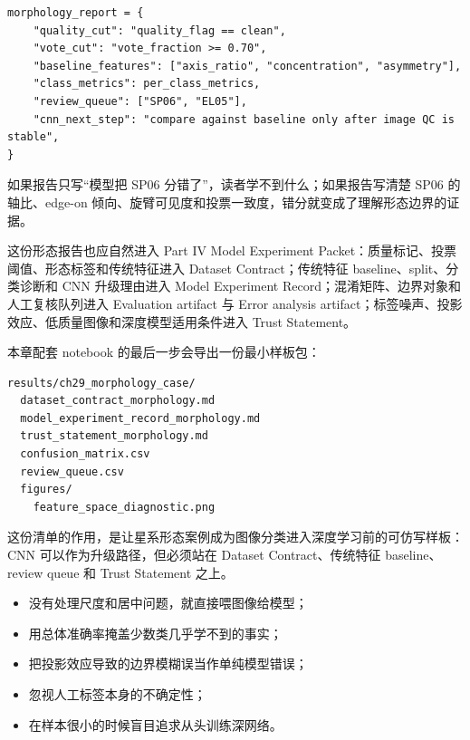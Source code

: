 \begin{examplebox}[星系形态案例报告骨架]
\begin{lstlisting}[style=pythonstyle]
morphology_report = {
    "quality_cut": "quality_flag == clean",
    "vote_cut": "vote_fraction >= 0.70",
    "baseline_features": ["axis_ratio", "concentration", "asymmetry"],
    "class_metrics": per_class_metrics,
    "review_queue": ["SP06", "EL05"],
    "cnn_next_step": "compare against baseline only after image QC is stable",
}
\end{lstlisting}
\end{examplebox}

如果报告只写“模型把 SP06 分错了”，读者学不到什么；如果报告写清楚 SP06 的轴比、edge-on 倾向、旋臂可见度和投票一致度，错分就变成了理解形态边界的证据。

这份形态报告也应自然进入 Part IV Model Experiment Packet：质量标记、投票阈值、形态标签和传统特征进入 Dataset Contract；传统特征 baseline、split、分类诊断和 CNN 升级理由进入 Model Experiment Record；混淆矩阵、边界对象和人工复核队列进入 Evaluation artifact 与 Error analysis artifact；标签噪声、投影效应、低质量图像和深度模型适用条件进入 Trust Statement。

本章配套 notebook 的最后一步会导出一份最小样板包：

\begin{examplebox}
\begin{lstlisting}[style=terminal]
results/ch29_morphology_case/
  dataset_contract_morphology.md
  model_experiment_record_morphology.md
  trust_statement_morphology.md
  confusion_matrix.csv
  review_queue.csv
  figures/
    feature_space_diagnostic.png
\end{lstlisting}
\end{examplebox}

这份清单的作用，是让星系形态案例成为图像分类进入深度学习前的可仿写样板：CNN 可以作为升级路径，但必须站在 Dataset Contract、传统特征 baseline、review queue 和 Trust Statement 之上。

\begin{warnbox}[星系形态分类中的常见误区]
\begin{itemize}
    \item 没有处理尺度和居中问题，就直接喂图像给模型；
    \item 用总体准确率掩盖少数类几乎学不到的事实；
    \item 把投影效应导致的边界模糊误当作单纯模型错误；
    \item 忽视人工标签本身的不确定性；
    \item 在样本很小的时候盲目追求从头训练深网络。
\end{itemize}
\end{warnbox}

